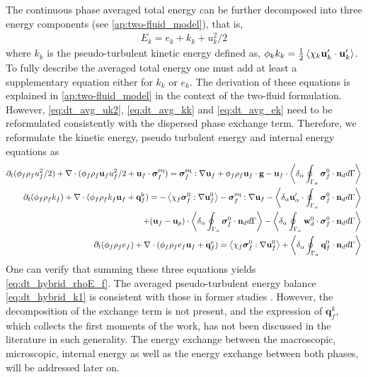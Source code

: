 The continuous phase averaged total energy can be further decomposed into three energy components (see \ref{ap:two-fluid_model}), that is,  
\begin{align}
    E_k = e_k + k_k + u_k^2/2
    \label{eq:E_def}
\end{align}
where $k_k$ is the pseudo-turbulent kinetic energy defined as, $\phi_k k_k = \frac{1}{2}\left<\chi_k \textbf{u}_k'\cdot \textbf{u}_k'\right>$. 
To fully describe the averaged total energy one must add at least a supplementary equation either for $k_k$ or $e_k$. 
The derivation of these equations is explained in \ref{ap:two-fluid_model} in the context of the two-fluid formulation. 
However, \ref{eq:dt_avg_uk2}, \ref{eq:dt_avg_kk} and \ref{eq:dt_avg_ek} need to be reformulated consistently with the dispersed phase exchange term. 
Therefore, we reformulate the kinetic energy, pseudo turbulent energy and internal energy equations as
\begin{align}
    \partial_t (\phi_f \rho_fu_f^2/2)  
    + \mathbf{\nabla}\cdot (
        \phi_f \rho_f\textbf{u}_fu_f^2/2
        + \textbf{u}_f \cdot \bm{\sigma}_f^\text{eq}
    )
    = 
     \bm{\sigma}_f^\text{eq} : \mathbf{\nabla} \textbf{u}_f
    + \phi_f \rho_f \textbf{u}_f\cdot \textbf{g} 
    -  \textbf{u}_f\cdot 
        \left<\delta_\alpha \oint_{\Gamma_\alpha} {\bm{\sigma}_f^0 \cdot \textbf{n}_d} d\Gamma\right> 
        \\
    \label{eq:dt_hybrid_k1}
    \partial_t (\phi_f\rho_fk_f)  
    + \mathbf{\nabla}\cdot (
        \phi_f\rho_fk_f\textbf{u}_f
        + \textbf{q}_f^\text{k} 
        )
    = 
    - \left<\chi_f\bm{\sigma}_f^0 : \mathbf{\nabla} \textbf{u}_f^0\right>
    - \bm{\sigma}_f^\text{eq} : \mathbf{\nabla} \textbf{u}_f\nonumber
    - \left<\delta_\alpha  \textbf{u}_\alpha' \cdot \oint_{\Gamma_\alpha}   \bm{\sigma}_f^0 \cdot \textbf{n}_d d\Gamma\right>\\
    + (\textbf{u}_f - \textbf{u}_p)\cdot \left<\delta_\alpha \oint_{\Gamma_\alpha} {\bm{\sigma}_f^0 \cdot \textbf{n}_d} d\Gamma\right> 
    - \left<\delta_\alpha  \oint_{\Gamma_\alpha} \textbf{w}_d^0 \cdot \bm{\sigma}_f^0 \cdot \textbf{n}_d d\Gamma\right> 
    \\
    \label{eq:dt_hybrid_e1}
    \partial_t (\phi_f\rho_fe_f)  
    + \mathbf{\nabla}\cdot (
        \phi_f \rho_fe_f\textbf{u}_f
        +
        \textbf{q}_f^\text{e} 
        )
    = 
    \left<\chi_f\bm{\sigma}_f^0 : \mathbf{\nabla} \textbf{u}_f^0\right>
    + \left<\delta_\alpha \oint_{\Gamma_\alpha} {\textbf{q}_f^0 \cdot \textbf{n}_d} d\Gamma\right> 
\end{align}
One can verify that summing these three equations yields \ref{eq:dt_hybrid_rhoE_f}. 
The averaged pseudo-turbulent energy balance \eqref{eq:dt_hybrid_k1} is consistent with those in former studies \citep[Chapter 7]{morel2015mathematical}\citep[Chapter 2]{scorsim2021particle}\citet{kataoka1989basic}. 
However, the decomposition of the exchange term is not present, and the expression of $\textbf{q}_f^k$, which collects the first moments of the work, has not been discussed in the literature in such generality.
The energy exchange between the macroscopic, microscopic, internal energy as well as the energy exchange between both phases, will be addressed later on.   

